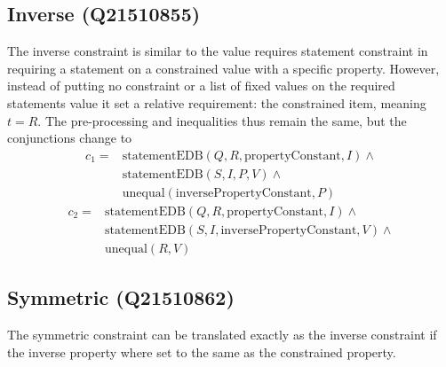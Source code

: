 \documentclass[hyperref,bachelorofscience,fleqn]{cgvpub}
\begin{document}
\subsection{Inverse (Q21510855)}
The inverse constraint is similar to the value requires statement constraint in requiring a statement on a constrained value with a specific property. However, instead of putting no constraint or a list of fixed values on the required statements value it set a relative requirement: the constrained item, meaning \(t = R\). The pre-processing and inequalities thus remain the same, but the conjunctions change to 
\begin{equation*}
\begin{split}
c_1 = &\text{statementEDB}(Q, R, \text{propertyConstant}, I) \wedge{} \\
&\text{statementEDB}(S, I, P, V) \wedge{} \\
&\text{unequal}(\text{inversePropertyConstant}, P)
\end{split}
\end{equation*}
\begin{equation*}
\begin{split}
c_2 = &\text{statementEDB}(Q, R, \text{propertyConstant}, I) \wedge{} \\
&\text{statementEDB}(S, I, \text{inversePropertyConstant}, V) \wedge{} \\
&\text{unequal}(R, V)
\end{split}
\end{equation*}

\subsection{Symmetric (Q21510862)}
The symmetric constraint can be translated exactly as the inverse constraint if the inverse property where set to the same as the constrained property.
\end{document}
